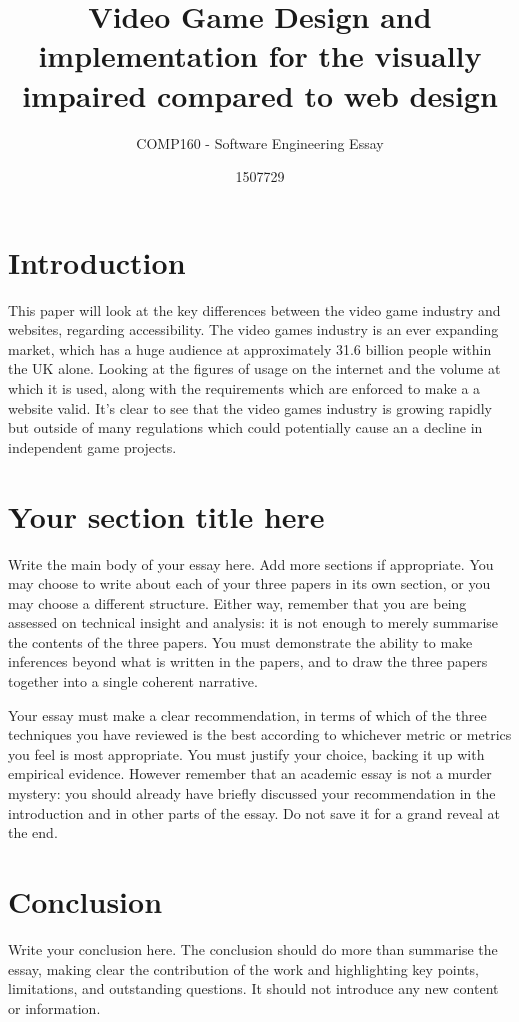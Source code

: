 \documentclass{scrartcl}
\title{Video Game Design and implementation for the visually impaired compared to web design}
\subtitle{COMP160 - Software Engineering Essay}
\author{1507729}
\begin{document}
\maketitle



\section{Introduction}

This paper will look at the key differences between the video game industry and websites, regarding accessibility. The video games industry is an ever expanding market, which has a huge audience at approximately 31.6 billion people within the UK alone. \cite{UKIE2017Games} Looking at the figures of usage on the internet and the volume at which it is used, along with the requirements which are enforced to make a a website valid. \cite{world2017internet} \cite{caldwell2008web} It's clear to see that the video games industry is growing rapidly but outside of many regulations which could potentially cause an a decline in independent game projects.

\section{Your section title here}

Write the main body of your essay here. Add more sections if appropriate. You may choose to write about each of your three papers in its own section, or you may choose a different structure. Either way, remember that you are being assessed on technical insight and analysis: it is not enough to merely summarise the contents of the three papers. You must demonstrate the ability to make inferences beyond what is written in the papers, and to draw the three papers together into a single coherent narrative.

Your essay must make a clear recommendation, in terms of which of the three techniques you have reviewed is the best according to whichever metric or metrics you feel is most appropriate. You must justify your choice, backing it up with empirical evidence. However remember that an academic essay is not a murder mystery: you should already have briefly discussed your recommendation in the introduction and in other parts of the essay. Do not save it for a grand reveal at the end.

\section{Conclusion}

Write your conclusion here. The conclusion should do more than summarise the essay, making clear the contribution of the work and highlighting key points, limitations, and outstanding questions. It should not introduce any new content or information.



\end{document}
